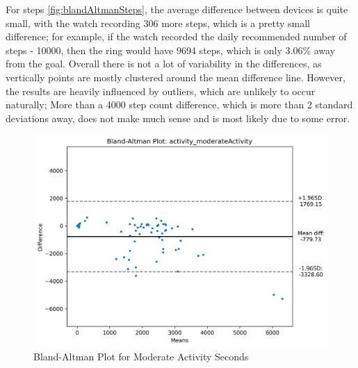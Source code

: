 For steps \ref{fig:blandAltmanSteps}, the average difference between devices is quite small, with the watch recording 306 more steps, which is a pretty small difference; for example, if the watch recorded the daily recommended number of steps - 10000, then the ring would have 9694 steps, which is only 3.06\% away from the goal. Overall there is not a lot of variability in the differences, as vertically points are mostly clustered around the mean difference line. However, the results are heavily influenced by outliers, which are unlikely to occur naturally; More than a 4000 step count difference, which is more than 2 standard deviations away, does not make much sense and is most likely due to some error. 
\begin{figure}
    
    \centering
    \includegraphics[width=\textwidth,keepaspectratio]{../images/bland_altman_moderateActivity.png}
    \caption{Bland-Altman Plot for Moderate Activity Seconds}
    \label{fig:blandAltmanSoftActivity}
    
\end{figure}

